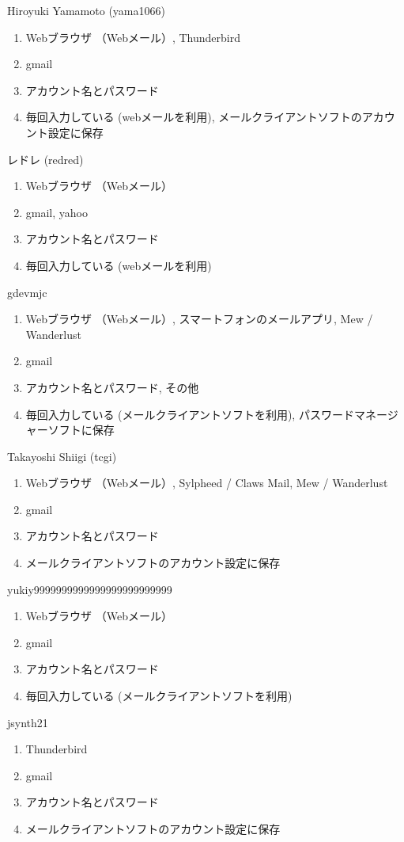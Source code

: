 \begin{prework}{ Hiroyuki Yamamoto (yama1066) }
  \begin{enumerate}
  \item Webブラウザ （Webメール）, Thunderbird
  \item gmail
  \item アカウント名とパスワード
  \item 毎回入力している (webメールを利用), メールクライアントソフトのアカウント設定に保存
  \end{enumerate}
\end{prework}

\begin{prework}{ レドレ (redred) }
  \begin{enumerate}
  \item Webブラウザ （Webメール）
  \item gmail, yahoo
  \item アカウント名とパスワード
  \item 毎回入力している (webメールを利用)
  \end{enumerate}
\end{prework}

\begin{prework}{ gdevmjc }
  \begin{enumerate}
  \item Webブラウザ （Webメール）, スマートフォンのメールアプリ, Mew / Wanderlust
  \item gmail
  \item アカウント名とパスワード, その他
  \item 毎回入力している (メールクライアントソフトを利用), パスワードマネージャーソフトに保存
  \end{enumerate}
\end{prework}

\begin{prework}{ Takayoshi Shiigi (tcgi) }
  \begin{enumerate}
  \item Webブラウザ （Webメール）, Sylpheed / Claws Mail, Mew / Wanderlust
  \item gmail
  \item アカウント名とパスワード
  \item メールクライアントソフトのアカウント設定に保存
  \end{enumerate}
\end{prework}

\begin{prework}{ yukiy9999999999999999999999999 }
  \begin{enumerate}
  \item Webブラウザ （Webメール）
  \item gmail
  \item アカウント名とパスワード
  \item 毎回入力している (メールクライアントソフトを利用)
  \end{enumerate}
\end{prework}

\begin{prework}{ jsynth21 }
  \begin{enumerate}
  \item Thunderbird
  \item gmail
  \item アカウント名とパスワード
  \item メールクライアントソフトのアカウント設定に保存
  \end{enumerate}
\end{prework}
